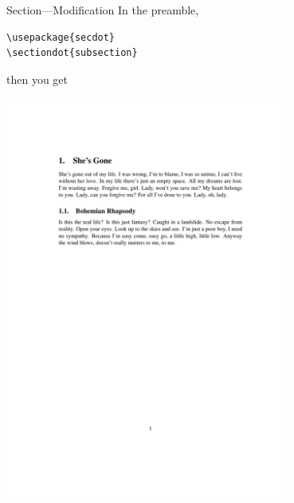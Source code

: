 \documentclass[12pt]{gshs_lecture}
\begin{document}
\begin{frame}[t,fragile]{Section---Modification}\small
In the preamble,
\begin{block}{}
\begin{lstlisting}
\usepackage{secdot}
\sectiondot{subsection}
\end{lstlisting}
\end{block}
then you get
\begin{center}
\begin{framed}
\includegraphics[width=0.7\textwidth,trim={1cm 18cm 1cm 4cm},clip]{./test_article/article004.pdf}
\end{framed}
\end{center}
\end{frame}
\end{document}
